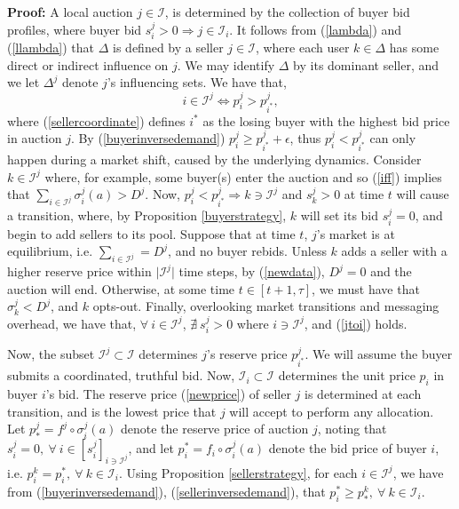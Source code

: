 \documentclass[sigconf, anonymous]{acmart}
\newcommand{\mcI}{\mathcal{I}}
\newcommand{\g}{\sigma}
\theoremstyle{definition}
\begin{document}
\textbf{Proof:}
A local auction $j\in\mcI$, is determined by the collection of buyer bid
profiles, where buyer bid $s_i^j > 0 \Rightarrow j\in\mcI_i$. It follows from
(\ref{lambda}) and (\ref{llambda}) that $\Delta$ is defined by a seller $j\in\mcI$, where each
user $k\in\Delta$ has some direct or indirect influence on $j$. 
We may identify $\Delta$ by its dominant seller, and we let $\Delta^j$ denote $j$'s
influencing sets. We have that, 
\begin{equation}\label{iff}
    i\in\mcI^j \Leftrightarrow p_i^j > p_{i^*}^j,
\end{equation}
where
(\ref{sellercoordinate}) defines $i^*$ as the losing buyer with the highest bid
price in auction $j$. By (\ref{buyerinversedemand}) $p_i^j \ge
p_{i^*}^j+\epsilon$, thus $p_i^j < p_{i^*}^j$ can only happen during a market
shift, caused by the underlying dynamics.
Consider $k\in\mcI^j$ where, for example, some buyer(s) enter the auction and
so (\ref{iff}) implies that
$\sum_{i\in\mcI^j} \g_i^j(a) > D^j$. Now, $p_i^j < p_{i^*}^j\Rightarrow k\ni\mcI^j$ and
$s_k^j>0$ at time $t$ will cause a transition, where, by Proposition \ref{buyerstrategy}, $k$ will set its bid $s_i^j=0$, and begin to add sellers to its pool.
Suppose that at time $t$, $j$'s market is at equilibrium, i.e. $\sum_{i\in\mcI^j} = D^j$, and
no buyer rebids. Unless $k$ adds a seller with a higher reserve
price within $\vert\mcI^j\vert$ time steps, by (\ref{newdata}), $D^j=0$ and the
auction will end. Otherwise, at some time $t\in[t+1,\tau]$, we must have that $\g_k^j <
D^j$, and $k$ opts-out. Finally, overlooking market transitions and messaging
overhead, we have that,
$\forall \ i\in\mcI^j$, $\nexists \ s_i^j > 0$ where $i \ni \mcI^j$, and (\ref{jtoi})
holds.
\iffalse
Furthermore, we note that $\lambda \subset \mcI$ is a complete and disjoint set
of bid vectors with respect to auction $j$. That is, $\forall \ i \in \mcI^j,
s_i^k > 0 \in \lambda$ if and only if $s_i^k>0 \in\mcI$, and so $s_i \in \lambda
\equiv s_i \in \mcI$. (NEED TO ADD TO LEMMA AND PROVE?)
\fi

Now, the subset $\mcI^j \subset \mcI$
determines $j$'s reserve price $p_{i^*}^j$. We will assume the buyer submits a
coordinated, truthful bid. Now, $\mcI_i\subset \mcI$ 
determines the unit price $p_{i}$ in buyer $i$'s bid.
The reserve price (\ref{newprice}) of seller $j$ is determined at each
transition, and is
the lowest price that $j$ will accept to perform any allocation.
Let $p_*^j = f^j \circ \g_i^j(a) $ denote the reserve
price of auction $j$, noting that $s_i^j=0, \ \forall \ i \in
[s_i^j]_{i\ni\mcI^j}$, and let $p_i^*= f_i \circ \g_i^j(a)$ denote the bid price of buyer $i$, i.e. $p_i^k = p_i^*,
\ \forall \ k \in\mcI_i$. 
Using Proposition
\ref{sellerstrategy}, for each $i \in \mcI^j$, we have from (\ref{buyerinversedemand}), (\ref{sellerinversedemand}), that $p_i^* \ge p_*^k,
\ \forall \ k \in\mcI_i$.
\end{document}
